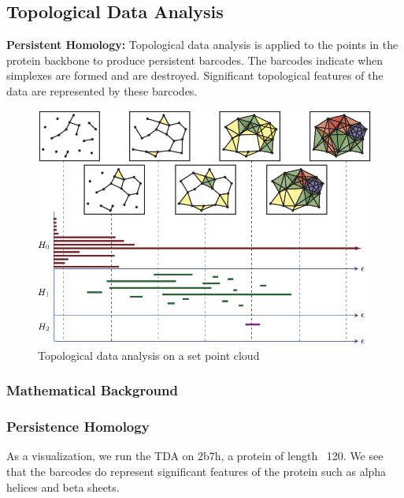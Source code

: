\documentclass[12pt, a4paper, twocolumn, fullpage]{article}
\theoremstyle{plain}
\theoremstyle{definition}
\theoremstyle{remark}
\begin{document}
\subsection{ Topological Data Analysis}
\textbf{Persistent Homology: } Topological data analysis is applied to the points in the protein backbone to produce persistent barcodes. The barcodes indicate when simplexes are formed and are destroyed. Significant topological features of the data are represented by these barcodes.


\begin{figure}[h]
	\includegraphics[width=\linewidth]{tdaexample.png}
	\caption{Topological data analysis on a set point cloud}
	\label{fig:tdaex}
\end{figure}


\subsubsection{ Mathematical Background}

\subsubsection{Persistence Homology}
As a visualization, we run the TDA on 2b7h, a protein of length ~120. We see that the barcodes do represent significant features of the protein such as alpha helices and beta sheets.
\end{document}
